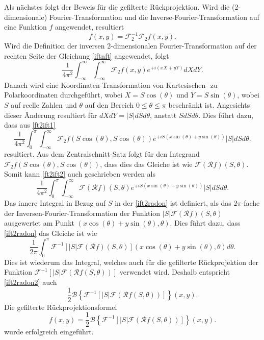 Als nächstes folgt der Beweis für die gefilterte Rückprojektion. Wird die (2-dimensionale) Fourier-Transformation und die Inverse-Fourier-Transformation auf eine Funktion $f$ angewendet, resultiert 
\begin{equation}\label{iftnft}
	f(x, y) = \mathscr{F}_2^{-1} \mathscr{F}_2 f(x, y).
\end{equation}
Wird die Definition der inversen 2-dimensionalen Fourier-Transformation auf der rechten Seite der Gleichung \ref{iftnft} angewendet, folgt
\begin{equation}\label{ft2ift1}
	\dfrac{1}{4\pi^2} \int_{-\infty}^{\infty}\int_{-\infty}^{\infty} \mathscr{F}_2 f(x, y)e^{+i(xX + yY)}dXdY.
\end{equation}
Danach wird eine Koordinaten-Transformation von Kartesischen- zu Polarkoordinaten durchgeführt, wobei $X = S\cos(\theta)$ und $Y = S\sin(\theta)$, wobei $S$ auf reelle Zahlen und $\theta$ auf den Bereich $0 \le \theta \le \pi$ beschränkt ist. Angesichts dieser Änderung resultiert für $dXdY = |S|dSd\theta$, anstatt $SdSd\theta$. Dies führt dazu, dass aus \ref{ft2ift1}
\begin{equation}\label{ft2ift2}
	\dfrac{1}{4\pi^2} \int_{0}^{\pi}\int_{-\infty}^{\infty} \mathscr{F}_2 f(S\cos(\theta), S\cos(\theta))e^{+iS(x\sin(\theta) + y\sin(\theta))}|S|dSd\theta.
\end{equation}
resultiert. Aus dem Zentralschnitt-Satz folgt für den Integrand $\mathscr{F}_2 f(S\cos(\theta), S\cos(\theta))$, dass dies das Gleiche ist wie $\mathscr{F}(\mathscr{R}f)(S, \theta)$. Somit kann \ref{ft2ift2} auch geschrieben werden als
\begin{equation}\label{ift2radon}
	\dfrac{1}{4\pi^2} \int_{0}^{\pi}\int_{-\infty}^{\infty} \mathscr{F}(\mathscr{R}f)(S, \theta)e^{+iS(x\sin(\theta) + y\sin(\theta))}|S|dSd\theta.
\end{equation}
Das innere Integral in Bezug auf $S$ in der \ref{ift2radon} ist definiert, als das $2\pi$-fache der Inversen-Fourier-Transformation der Funktion $|S|\mathscr{F}(\mathscr{R}f)(S, \theta)$ ausgewertet am Punkt $(x\cos(\theta) + y\sin(\theta), \theta)$. Dies führt dazu, dass \ref{ift2radon} das Gleiche ist wie 
\begin{equation}\label{ift2radon2}
	\dfrac{1}{2\pi} \int_{0}^{\pi} \mathscr{F}^{-1}[|S|\mathscr{F}(\mathscr{R}f)(S, \theta)](x\cos(\theta)+y\sin(\theta), \theta)d\theta.
\end{equation}
Dies ist wiederum das Integral, welches auch für die gefilterte Rückprojektion der Funktion $\mathscr{F}^{-1}[|S|\mathscr{F}(\mathscr{R}f(S, \theta))]$ verwendet wird. Deshalb entspricht \ref{ift2radon2} auch
\begin{equation}
	\dfrac{1}{2}\mathscr{B}\left\{\mathscr{F}^{-1}[|S|\mathscr{F}(\mathscr{R}f(S, \theta))]\right\}(x,y).
\end{equation}
Die gefilterte Rückprojektionsformel 
\begin{equation}
	f(x, y) = \dfrac{1}{2}\mathscr{B}\left\{\mathscr{F}^{-1}[|S|\mathscr{F}(\mathscr{R}f(S, \theta))]\right\}(x,y).
\end{equation}
wurde erfolgreich eingeführt.

